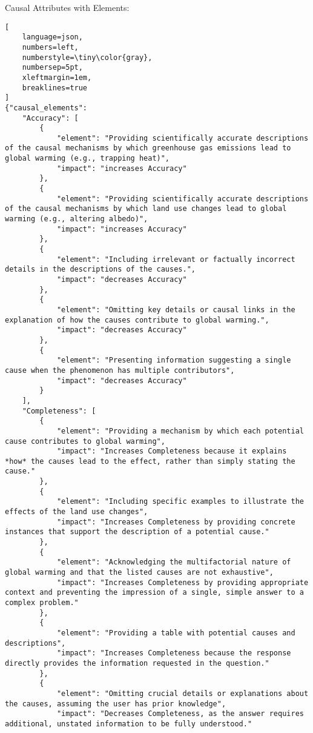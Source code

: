 \begin{promptbox}{Causal Attributes with Elements:}
\begin{lstlisting}[
    language=json,
    numbers=left,
    numberstyle=\tiny\color{gray},
    numbersep=5pt,
    xleftmargin=1em,
    breaklines=true
]
{"causal_elements":
    "Accuracy": [
        {
            "element": "Providing scientifically accurate descriptions of the causal mechanisms by which greenhouse gas emissions lead to global warming (e.g., trapping heat)",
            "impact": "increases Accuracy"
        },
        {
            "element": "Providing scientifically accurate descriptions of the causal mechanisms by which land use changes lead to global warming (e.g., altering albedo)",
            "impact": "increases Accuracy"
        },
        {
            "element": "Including irrelevant or factually incorrect details in the descriptions of the causes.",
            "impact": "decreases Accuracy"
        },
        {
            "element": "Omitting key details or causal links in the explanation of how the causes contribute to global warming.",
            "impact": "decreases Accuracy"
        },
        {
            "element": "Presenting information suggesting a single cause when the phenomenon has multiple contributors",
            "impact": "decreases Accuracy"
        }
    ],
    "Completeness": [
        {
            "element": "Providing a mechanism by which each potential cause contributes to global warming",
            "impact": "Increases Completeness because it explains *how* the causes lead to the effect, rather than simply stating the cause."
        },
        {
            "element": "Including specific examples to illustrate the effects of the land use changes",
            "impact": "Increases Completeness by providing concrete instances that support the description of a potential cause."
        },
        {
            "element": "Acknowledging the multifactorial nature of global warming and that the listed causes are not exhaustive",
            "impact": "Increases Completeness by providing appropriate context and preventing the impression of a single, simple answer to a complex problem."
        },
        {
            "element": "Providing a table with potential causes and descriptions",
            "impact": "Increases Completeness because the response directly provides the information requested in the question."
        },
        {
            "element": "Omitting crucial details or explanations about the causes, assuming the user has prior knowledge",
            "impact": "Decreases Completeness, as the answer requires additional, unstated information to be fully understood."

\end{lstlisting}
\end{promptbox}

